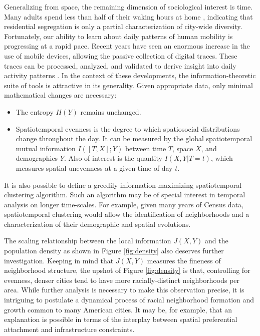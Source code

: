 Generalizing from space, the remaining dimension of sociological interest is time. Many adults spend less than half of their waking hours at home \cite{employment_stats}, indicating that residential segregation is only a partial characterization of city-wide diversity. Fortunately, our ability to learn about daily patterns of human mobility is progressing at a rapid pace. Recent years have seen an enormous increase in the use of mobile devices, allowing the passive collection of digital traces. These traces can be processed, analyzed, and validated to derive insight into daily activity patterns \cite{Widhalm2015,Yang,Jiang2013,Jiang2012c}. In the context of these developments, the information-theoretic suite of tools is attractive in its generality. Given appropriate data, only minimal mathematical changes are necessary: 
\begin{itemize} 
	\item The entropy $H(Y)$ remains unchanged. 
	\item Spatiotemporal evenness is the degree to which spatiosocial distributions change throughout the day. It can be measured by the global spatiotemporal mutual information $I([T,X];Y)$ between time $T$, space $X$, and demographics $Y$. Also of interest is the quantity $I(X,Y|T=t)$, which measures spatial unevenness at a given time of day $t$. 
\end{itemize}
It is also possible to define a greedily information-maximizing spatiotemporal clustering algorithm. Such an algorithm may be of special interest in temporal analysis on longer time-scales. For example, given many years of Census data, spatiotemporal clustering would allow the identification of neighborhoods and a characterization of their demographic and spatial evolutions. 

The scaling relationship between the local information $J(X,Y)$ and the population density as shown in Figure \ref{fig:density} also deserves further investigation. Keeping in mind that $J(X,Y)$ measures the fineness of neighborhood structure, the upshot of Figure \ref{fig:density} is that, controlling for evenness, denser cities tend to have more racially-distinct neighborhoods per area. While further analysis is necessary to make this observation precise, it is intriguing to postulate a dynamical process of racial neighborhood formation and growth common to many American cities. It may be, for example, that an explanation is possible in terms of the interplay between spatial preferential attachment and infrastructure constraints. 
